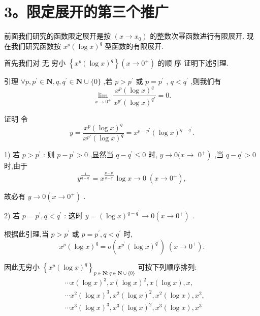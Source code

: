 \section*{3。限定展开的第三个推广}

前面我们研究的函数限定展开是按 $\left( {x \rightarrow  {x}_{0}}\right)$ 的整数次幂函数进行有限展开. 现在我们研究函数按 ${x}^{p}{\left( \log x\right) }^{q}$ 型函数的有限展开.

首先我们对 无 穷小 $\left\{  {{x}^{p}{\left( \log x\right) }^{q}}\right\}  \left( {x \rightarrow  {0}^{ + }}\right)$ 的顺 序 证明下述引理.

引理 $\forall p,{p}^{\prime } \in  \mathbf{N},q,{q}^{\prime } \in  \mathbf{N} \cup  \{ 0\}$ ,若 $p > {p}^{\prime }$ 或 $p = {p}^{\prime }$ , $q < {q}^{\prime }$ ,则我们有
$$\mathop{\lim }\limits_{{x \rightarrow  {0}^{ + }}}\frac{{x}^{p}{\left( \log x\right) }^{q}}{{x}^{p\prime }{\left( \log x\right) }^{q\prime }} = 0.$$

证明 令
$$y = \frac{{x}^{p}{\left( \log x\right) }^{q}}{{x}^{p\prime }{\left( \log x\right) }^{q}} = {x}^{p - {p}^{\prime }}{\left( \log x\right) }^{q - {q}^{\prime }}.$$

1) 若 $p > {p}^{\prime }$ : 则 $p - {p}^{\prime } > 0$ ,显然当 $q - {q}^{\prime } \leq  0$ 时, $y \rightarrow  0(x \rightarrow$  $\left. {0}^{ + }\right)$ ,当 $q - {q}^{\prime } > 0$ 时,由于
$${y}^{\frac{1}{q - {q}^{\prime }}} = {x}^{\frac{p - {p}^{\prime }}{q - {q}^{\prime }}}\log x \rightarrow  0\;\left( {x \rightarrow  {0}^{ + }}\right) ,$$

故必有 $y \rightarrow  0\left( {x \rightarrow  {0}^{ + }}\right)$ .

2) 若 $p = {p}^{\prime },q < {q}^{\prime }$ : 这时 $y = {\left( \log x\right) }^{q - {q}^{\prime }} \rightarrow  0\left( {x \rightarrow  {0}^{ + }}\right)$ .

根据此引理,当 $p > {p}^{\prime }$ 或 $p = {p}^{\prime },q < {q}^{\prime }$ 时,
$${x}^{p}{\left( \log x\right) }^{q} = o\left( {{x}^{{p}^{\prime }}{\left( \log x\right) }^{{q}^{\prime }}}\right) \;\left( {x \rightarrow  {0}^{ + }}\right) .$$

因此无穷小 ${\left\{  {x}^{p}{\left( \log x\right) }^{q}\right\}  }_{p \in  \mathbf{N} : q \in  \mathbf{N} \cup  \{ 0\} }$ 可按下列顺序排列:
\begin{align*}
	&\cdots x{\left( \log x\right) }^{3},x{\left( \log x\right) }^{2},x\left( {\log x}\right) ,x,\\
	&\cdots {x}^{2}{\left( \log x\right) }^{3},{x}^{2}{\left( \log x\right) }^{2},{x}^{2}\left( {\log x}\right) ,{x}^{2},\\
	&\cdots {x}^{3}{\left( \log x\right) }^{3},{x}^{3}{\left( \log x\right) }^{2},{x}^{3}\left( {\log x}\right) ,{x}^{3}
\end{align*}

